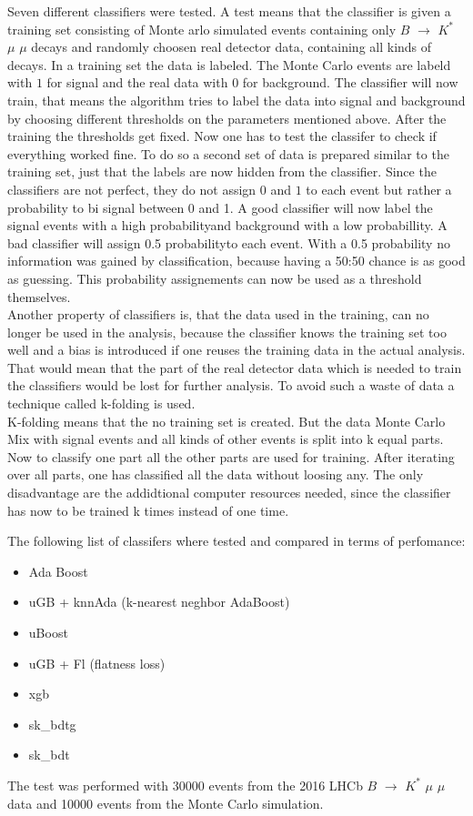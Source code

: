 \documentclass[english]{uzhpub}
\begin{document}
Seven different classifiers were tested. A test means that the classifier is given a training set consisting of Monte arlo simulated events containing only $B$ $\rightarrow$ $K^{*}$ $\mu$ $\mu$ decays and randomly choosen real detector data, containing all kinds of decays. In a training set the data is labeled. The Monte Carlo events are labeld with $1$ for signal and the real data with $0$ for background. The classifier will now train, that means the algorithm tries to label the data into signal and background by choosing different thresholds on the parameters mentioned above. After the training the thresholds get fixed. Now one has to test the classifer to check if everything worked fine. To do so a second set of data is prepared similar to the training set, just that the labels are now hidden from the classifier. Since the classifiers are not perfect, they do not assign $0$ and $1$ to each event but rather a probability to bi signal between 0 and 1. A good classifier will now label the signal events with a high probabilityand background with a low probabillity. A bad classifier will assign 0.5 probabilityto each event.
With a 0.5 probability no information was gained by classification, because having a 50:50 chance is as good as guessing. This probability assignements can now be used as a threshold themselves. \\
Another property of classifiers is, that the data used in the training, can no longer be used in the analysis, because the classifier knows the training set too well and a bias is introduced if one reuses the training data in the actual analysis. That would mean that the part of the real detector data which is needed to train the classifiers would be lost for further analysis. To avoid such a waste of data a technique called k-folding is used. \\
K-folding means that the no training set is created. But the data Monte Carlo Mix with signal events and all kinds of other events is split into k equal parts. Now to classify one part all the other parts are used for training. After iterating over all parts, one has classified all the data without loosing any. The only disadvantage are the addidtional computer resources needed, since the classifier has now to be trained k times instead of one time.

 The following list of classifers where tested and compared in terms of perfomance:
 \begin{itemize}
  \item Ada Boost \cite{bib:AdaBoost}
  \item uGB \cite{bib:ugb} + knnAda (k-nearest neghbor AdaBoost)
  \item uBoost \cite{bib:uBoost}
  \item uGB \cite{bib:ugb} + Fl (flatness loss)
  \item xgb \cite{bib:xgb}
  \item sk\_bdtg \cite{bib:bdtg}
  \item sk\_bdt \cite{bib:bdt}
 \end{itemize}
 The test was performed with 30000 events from the 2016 LHCb $B$ $\rightarrow$ $K^{*}$ $\mu$ $\mu$ data and 10000 events from the Monte Carlo simulation.
\end{document}
